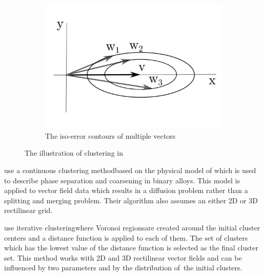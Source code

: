 \begin{figure}[h]
\begin{subfigure}{0.4\textwidth}
    	\includegraphics[width=\textwidth]{./illustrations/telea-ellipse_contours-embedded_font.pdf}
    	\caption{The iso-error contours of multiple vectors}
	\end{subfigure}
\caption[The illustration of clustering in \citet{Telea99}]{The illustration of clustering in \citet{Telea99}}
\label{fig:illustration-telea_hierarchical_clustering}
\end{figure}

\citet{Garcke00} use a continuous clustering method\footnotemark based on the physical model of \citet{CahnHilliard58} which is used to describe phase separation and coarsening in binary alloys. This model is applied to vector field data which results in a diffusion problem rather than a splitting and merging problem. Their algorithm also assumes an either 2D or 3D rectilinear grid.


\citet{Du04} use iterative clustering\footnotemark where Voronoi regions\footnotemark are created around the initial cluster centers and a distance function is applied to each of them. The set of clusters which has the lowest value of the distance function is selected as the final cluster set. This method works with 2D and 3D rectilinear vector fields and can be influenced by two parameters and by the distribution of~the initial clusters.

\addtocounter{footnote}{-2}


